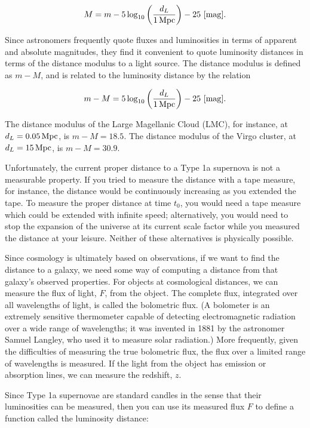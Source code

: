 \documentclass[a4paper,11pt]{article}
\begin{document}
\begin{align*}
    M = m -5\log_{10}\left(\frac{d_L}{1\,{\rm Mpc}}\right)-25 ~ [{\rm mag}].
\end{align*}

{\noindent}Since astronomers frequently quote fluxes and luminosities in terms of apparent and absolute magnitudes, they find it convenient to quote luminosity distances in terms of the distance modulus to a light source. The distance modulus is defined as $m-M$, and is related to the luminosity distance by the relation

\begin{align*}
    m - M = 5\log_{10}\left(\frac{d_L}{1\,{\rm Mpc}}\right)-25 ~ [{\rm mag}].
\end{align*}

{\noindent}The distance modulus of the Large Magellanic Cloud (LMC), for instance, at $d_L = 0.05\,{\rm Mpc}$, is $m - M = 18.5$. The distance modulus of the Virgo cluster, at $d_L = 15\,{\rm Mpc}$, is $m - M = 30.9$. 

{\noindent}Unfortunately, the current proper distance to a Type 1a supernova is not a measurable property. If you tried to measure the distance with a tape measure, for instance, the distance would be continuously increasing as you extended the tape. To measure the proper distance at time $t_0$, you would need a tape measure which could be extended with infinite speed; alternatively, you would need to stop the expansion of the universe at its current scale factor while you measured the distance at your leisure. Neither of these alternatives is physically possible.

{\noindent}Since cosmology is ultimately based on observations, if we want to find the distance to a galaxy, we need some way of computing a distance from that galaxy’s observed properties. For objects at cosmological distances, we can measure the flux of light, $F$, from the object. The complete flux, integrated over all wavelengths of light, is called the bolometric flux. (A bolometer is an extremely sensitive thermometer capable of detecting electromagnetic radiation over a wide range of wavelengths; it was invented in 1881 by the astronomer Samuel Langley, who used it to measure solar radiation.) More frequently, given the difficulties of measuring the true bolometric flux, the flux over a limited range of wavelengths is measured. If the light from the object has emission or absorption lines, we can measure the redshift, $z$.

{\noindent}Since Type 1a supernovae are standard candles in the sense that their luminosities can be measured, then you can use its measured flux $F$ to define a function called the luminosity distance:
\end{document}

